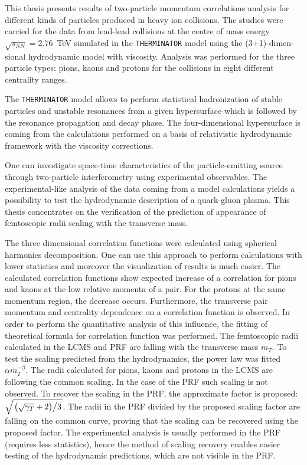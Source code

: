 
This thesis presents results of two-particle momentum correlations analysis for different kinds of particles produced in heavy ion collisions.
The studies were carried for the data from lead-lead collisions at the centre of mass energy \mbox{$\sqrt{s_{NN}}=2.76$~TeV} simulated in the \verb|THERMINATOR| model using the (3+1)-dimen-sional hydrodynamic model with viscosity.
Analysis was performed for the three particle types: pions, kaons and protons for the collisions in eight different centrality ranges.

The \verb|THERMINATOR| model allows to perform statistical hadronization of stable particles and unstable resonances from a given hypersurface which is followed by the resonance propagation and decay phase.
The four-dimensional hypersurface is coming from the calculations performed on a basis of relativistic hydrodynamic framework with the viscosity corrections.

One can investigate space-time characteristics of the particle-emitting source through two-particle interferometry using experimental observables.
The experimental-like analysis of the data coming from a model calculations yields a possibility to test the hydrodynamic description of a quark-gluon plasma.
This thesis concentrates on the verification of the prediction of appearance of femtoscopic radii scaling with the transverse mass.

The three dimensional correlation functions were calculated using spherical harmonics decomposition.
One can use this approach to perform calculations with lower statistics and moreover the visualization of results is much easier.
The calculated correlation functions show expected increase of a correlation for pions and kaons at the low relative momenta of a pair.
For the protons at the same momentum region, the decrease occurs.
Furthermore, the transverse pair momentum and centrality dependence on a correlation function is observed.
In order to perform the quantitative analysis of this influence, the fitting of theoretical formula for correlation function was performed.
The femtoscopic radii calculated in the LCMS and PRF are falling with the transverse mass $m_T$.
To test the scaling predicted from the hydrodynamics, the power law was fitted $\alpha m_T^{-\beta}$.
The radii calculated for pions, kaons and protons in the LCMS are following the common scaling.
In the case of the PRF such scaling is not observed.
To recover the scaling in the PRF, the approximate factor is proposed: $\sqrt{ \left. \left( \sqrt{\gamma_T} + 2 \right) \middle/ 3 \right. }$.
The radii in the PRF divided by the proposed scaling factor are falling on the common curve, proving that the scaling can be recovered using the proposed factor.
The experimental analysis is usually performed in the PRF (requires less statistics), hence the method of scaling recovery enables easier testing of the hydrodynamic predictions, which are not visible in the PRF.
